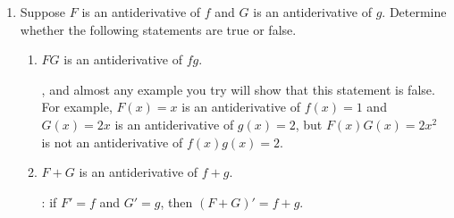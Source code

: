 \documentclass[main]{subfiles}
\begin{document}
\begin{enumerate}[resume,topsep=0pt]
\begin{enumerate}
    \begin{solution}
      False, and this problem is an example.  Here, Ali's velocity at noon
      is $v(0) = -9$ m/min, and his velocity at 12:04 is $v(4) = 15$
      m/min; the average of these two is $\frac{-9 + 15}{2} = 3$ m/min,
      but his average velocity between noon and 12:04 was $-5$ m/min.

      If this seems counterintuitive, imagine a runner who takes the
      following hour-long run: he starts off at a furious pace of 10 mph,
      but he can only maintain that for 1 minute.  For the next 58
      minutes, he runs at 3 mph, and then he finds the motivation to run
      at 10 mph again for the last minute.  It should be intuitive that
      the runner's average speed for his entire run is close to 3 mph,
      since he ran at that speed for almost the entire hour.  But the
      average of his starting and ending speeds is 10 mph -- totally
      different than his average speed for the hour!
    \end{solution}

  \end{enumerate}

\pspace{\newpage}

\item 
  Suppose $F$ is an antiderivative of $f$ and $G$ is an antiderivative
  of $g$. Determine whether the following statements are true or false.
  \begin{enumerate}
  \item 
    \begin{problem}[\vfill]
      $FG$ is an antiderivative of $fg$.
    \end{problem}

    \begin{solution}
      , and almost any example you try will show that this
      statement is false.  For example, $F(x) = x$ is an antiderivative of
      $f(x) = 1$ and $G(x) = 2x$ is an antiderivative of $g(x) = 2$, but
      $F(x) G(x) = 2x^2$ is not an antiderivative of $f(x) g(x) = 2$.
    \end{solution}

  \item 
    \begin{problem}[\vfill]
      $F + G$ is an antiderivative of $f + g$.
    \end{problem}

    \begin{solution}
      : if $F' = f$ and $G' = g$, then $(F + G)' = f + g$. 
    \end{solution}


\end{enumerate}
\end{enumerate}
\end{document}
